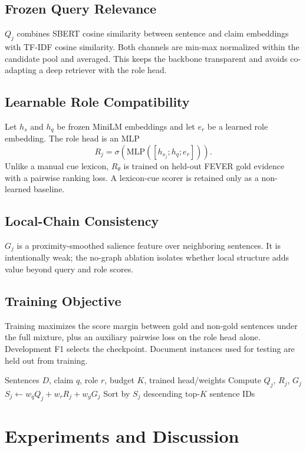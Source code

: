 \documentclass[cmc,article,submit,moreauthors,pdftex]{Definitions/tsp}
\begin{document}
\subsection{Frozen Query Relevance}
$Q_j$ combines SBERT cosine similarity between sentence and claim embeddings with TF-IDF cosine similarity. Both channels are min-max normalized within the candidate pool and averaged. This keeps the backbone transparent and avoids co-adapting a deep retriever with the role head.

\subsection{Learnable Role Compatibility}
Let $h_s$ and $h_q$ be frozen MiniLM embeddings and let $e_r$ be a learned role embedding. The role head is an MLP
\begin{equation}
R_j=\sigma\!\left(\mathrm{MLP}([h_{s_j};h_q;e_r])\right).
\end{equation}
Unlike a manual cue lexicon, $R_\theta$ is trained on held-out FEVER gold evidence with a pairwise ranking loss. A lexicon-cue scorer is retained only as a non-learned baseline.

\subsection{Local-Chain Consistency}
$G_j$ is a proximity-smoothed salience feature over neighboring sentences. It is intentionally weak; the no-graph ablation isolates whether local structure adds value beyond query and role scores.

\subsection{Training Objective}
Training maximizes the score margin between gold and non-gold sentences under the full mixture, plus an auxiliary pairwise loss on the role head alone. Development F1 selects the checkpoint. Document instances used for testing are held out from training.

\begin{algorithmic}[1]
\REQUIRE Sentences $D$, claim $q$, role $r$, budget $K$, trained head/weights
    \STATE Compute $Q_j$, $R_j$, $G_j$
    \STATE $S_j \leftarrow w_q Q_j + w_r R_j + w_g G_j$
\ENDFOR
\STATE Sort by $S_j$ descending
\RETURN top-$K$ sentence IDs
\end{algorithmic}

\section{Experiments and Discussion}
\label{sec:experiments}
\end{document}
